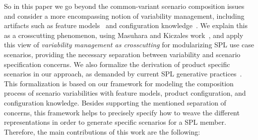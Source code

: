 \documentclass{sig-alternate}
\begin{document}
So in this paper we go beyond the common-variant scenario composition issues and
consider a more encompassing notion of variability management, including
artifacts such as feature models~\cite{Gheyi:2006aa,Czarnecki:2000aa} and
configuration knowledge~\cite{Czarnecki:2000aa,Pohl:2005aa}. We explain this as a
crosscutting phenomenon, using Masuhara and Kiczales work~\cite{Masuhara:2003aa},
and apply this view of \emph{variability management as crosscutting} for
modularizing SPL use case scenarios, providing the necessary separation between
variability and scenario specification concerns. We also formalize the derivation
of product specific scenarios in our approach, as demanded by current SPL
generative practices~\cite{Krueger:2006aa}. This formalization is based on our
framework for modeling the composition process of scenario variabilities with
feature models, product configuration, and configuration knowledge. Besides
supporting the mentioned separation of concerns, this framework helps to
precisely specify how to weave the different representations in order to generate
specific scenarios for a SPL member. Therefore, the main contributions of this
work are the following:
\end{document}
